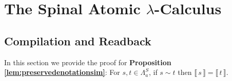 \documentclass[a4paper,UKenglish,cleveref, autoref]{lipics-v2019}
\newcommand{\FALC}{\Lambda^{S}_{a}}
\newcommand{\trans}[1]{\llbracket \, #1 \, \rrbracket}
\begin{document}
%
%
%
%
%







\newpage

\appendix

\section{The Spinal Atomic $\lambda$-Calculus}

\subsection{Compilation and Readback}

In this section we provide the proof for {\bf Proposition \ref{lem:preservedenotationsim}}: For $s, t \in \FALC$, if $s \sim t$ then $\trans{s} = \trans{t}$.
\end{document}
